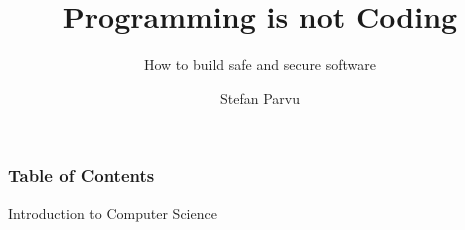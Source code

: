 \documentclass[aspectratio=1610]{beamer}
\title{\huge{Programming is not Coding}}
\subtitle{How to build safe and secure software}
\author{Stefan Parvu}
\begin{document}
\begin{frame}
\end{frame}


\begin{frame}
	\maketitle %
\end{frame}



\begin{frame}
\frametitle{Table of Contents}
\Large{Introduction to Computer Science}\\~\\
    \large
    \begin{columns}[onlytextwidth,T]
     
        \begin{column}{.55\textwidth}
            \vfill
            \tableofcontents[sections=1-3]
        \end{column}
        
        \begin{column}{.45\textwidth}
           
            \tableofcontents[sections=4-6]
        \end{column}
        
    \end{columns}
\end{frame}
\end{document}
